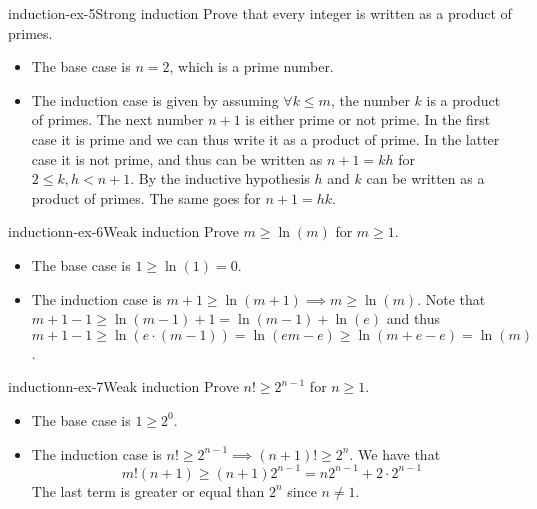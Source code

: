 \documentclass[preview]{standalone}
\begin{document}
\begin{snippetexercise}{induction-ex-5}{Strong induction}
    Prove that every integer is written as a product of primes.
    \begin{itemize}
        \item The base case is \(n=2\), which is a prime number.
        \item The induction case is given by assuming \(\forall k \leq m\),
        the number \(k\) is a product of primes. The next number \(n+1\)
        is either prime or not prime. In the first case it is prime and we can thus
        write it as a product of prime. In the latter case it is not prime, and thus can be written
        as \(n+1 = kh\) for \(2\leq k,h< n+1\).
        By the inductive hypothesis \(h\) and \(k\) can be written as a product of primes.
        The same goes for \(n+1=hk\). 
    \end{itemize}
\end{snippetexercise}

\begin{snippetexercise}{inductionn-ex-6}{Weak induction}
    Prove \(m \geq \ln(m)\) for \(m \geq 1\).
    \begin{itemize}
        \item The base case is \(1 \geq \ln(1)=0\).
        \item The induction case is \(m + 1\geq \ln(m + 1) \implies m \geq \ln(m)\).
        Note that \(m + 1 - 1 \geq \ln(m-1) + 1 = \ln(m-1) + \ln(e)\)
        and thus \(m + 1 - 1 \geq \ln(e\cdot(m-1)) = \ln(em-e) \geq \ln(m + e - e) = \ln(m)\).
    \end{itemize}
\end{snippetexercise}

\begin{snippetexercise}{inductionn-ex-7}{Weak induction}
    Prove \(n! \geq 2^{n-1}\) for \(n \geq 1\).
    \begin{itemize}
        \item The base case is \(1 \geq 2^0\).
        \item The induction case is \(n! \geq 2^{n-1} \implies (n+1)! \geq 2^n\).
        We have that \[m!(n+1) \geq (n+1)2^{n-1} = n2^{n-1} + 2\cdot2^{n-1}\]
        The last term is greater or equal than \(2^n\) since \(n\neq 1\).
    \end{itemize}
\end{snippetexercise}
\end{document}
